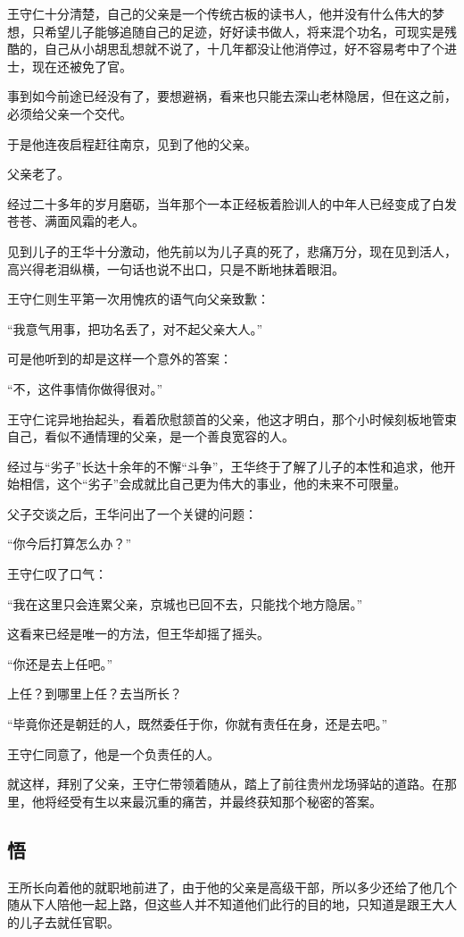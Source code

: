 \begin{multicols}{\theparacolNo}
		王守仁十分清楚，自己的父亲是一个传统古板的读书人，他并没有什么伟大的梦想，只希望儿子能够追随自己的足迹，好好读书做人，将来混个功名，可现实是残酷的，自己从小胡思乱想就不说了，十几年都没让他消停过，好不容易考中了个进士，现在还被免了官。

		事到如今前途已经没有了，要想避祸，看来也只能去深山老林隐居，但在这之前，必须给父亲一个交代。

		于是他连夜启程赶往南京，见到了他的父亲。

		父亲老了。

		经过二十多年的岁月磨砺，当年那个一本正经板着脸训人的中年人已经变成了白发苍苍、满面风霜的老人。

		见到儿子的王华十分激动，他先前以为儿子真的死了，悲痛万分，现在见到活人，高兴得老泪纵横，一句话也说不出口，只是不断地抹着眼泪。

		王守仁则生平第一次用愧疚的语气向父亲致歉：

		“我意气用事，把功名丢了，对不起父亲大人。”

		可是他听到的却是这样一个意外的答案：

		“不，这件事情你做得很对。”

		王守仁诧异地抬起头，看着欣慰颔首的父亲，他这才明白，那个小时候刻板地管束自己，看似不通情理的父亲，是一个善良宽容的人。

		经过与“劣子”长达十余年的不懈“斗争”，王华终于了解了儿子的本性和追求，他开始相信，这个“劣子”会成就比自己更为伟大的事业，他的未来不可限量。

		父子交谈之后，王华问出了一个关键的问题：

		“你今后打算怎么办？”

		王守仁叹了口气：

		“我在这里只会连累父亲，京城也已回不去，只能找个地方隐居。”

		这看来已经是唯一的方法，但王华却摇了摇头。

		“你还是去上任吧。”

		上任？到哪里上任？去当所长？

		“毕竟你还是朝廷的人，既然委任于你，你就有责任在身，还是去吧。”

		王守仁同意了，他是一个负责任的人。

		就这样，拜别了父亲，王守仁带领着随从，踏上了前往贵州龙场驿站的道路。在那里，他将经受有生以来最沉重的痛苦，并最终获知那个秘密的答案。

		\subsection{悟}
		王所长向着他的就职地前进了，由于他的父亲是高级干部，所以多少还给了他几个随从下人陪他一起上路，但这些人并不知道他们此行的目的地，只知道是跟王大人的儿子去就任官职。


\end{multicols}
